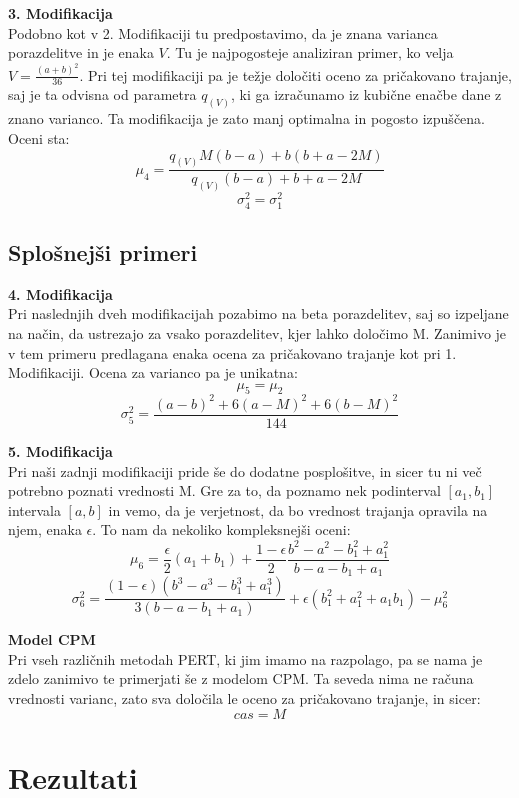 \documentclass[12pt, a4paper]{article}
\begin{document}
\vspace{0,5cm}
\textbf{3. Modifikacija}\\
Podobno kot v 2. Modifikaciji tu predpostavimo, da je znana varianca porazdelitve in je enaka $V$. Tu je najpogosteje analiziran primer, ko velja $V = \frac{(a + b)^2}{36}$. Pri tej modifikaciji pa je težje določiti oceno za pričakovano trajanje, saj je ta odvisna od parametra $q_{(V)}$, ki ga izračunamo iz kubične enačbe dane z znano varianco. Ta modifikacija je zato manj optimalna in pogosto izpuščena. Oceni sta:
$$\mu_4 = \frac{q_{(V)}M(b - a) + b(b + a -2M)}{q_{(V)}(b - a) + b + a - 2M}$$
$$\sigma_4^2 = \sigma_1^2$$


\subsection{Splošnejši primeri}
\textbf{4. Modifikacija}\\
Pri naslednjih dveh modifikacijah pozabimo na beta porazdelitev, saj so izpeljane na način, da ustrezajo za vsako porazdelitev, kjer lahko določimo M. Zanimivo je v tem primeru predlagana enaka ocena za pričakovano trajanje kot pri 1. Modifikaciji. Ocena za varianco pa je unikatna:
$$\mu_5 = \mu_2$$
$$\sigma_5^2 = \frac{(a - b)^2 + 6(a - M)^2 + 6(b - M)^2}{144}$$

\vspace{0,5cm}
\textbf{5. Modifikacija}\\
Pri naši zadnji modifikaciji pride še do dodatne posplošitve, in sicer tu ni več potrebno poznati vrednosti M. Gre za to, da poznamo nek podinterval $[a_1, b_1]$ intervala $[a, b]$ in vemo, da je verjetnost, da bo vrednost trajanja opravila na njem, enaka $\epsilon$. To nam da nekoliko kompleksnejši oceni:
$$\mu_6 = \frac{\epsilon}{2}(a_1 + b_1) + \frac{1 - \epsilon}{2}\frac{b^2 - a^2 - b_1^2 + a_1^2}{b - a - b_1 + a_1}$$
$$\sigma_6^2 = \frac{(1 - \epsilon)(b^3 - a^3 - b_1^3 + a_1^3)}{3(b - a - b_1 + a_1)} + \epsilon(b_1^2 + a_1^2 + a_1b_1) - \mu_6^2$$

\vspace{0,5cm}
\textbf{Model CPM}\\
Pri vseh različnih metodah PERT, ki jim imamo na razpolago, pa se nama je zdelo zanimivo te primerjati še z modelom CPM. Ta seveda nima ne računa vrednosti varianc, zato sva določila le oceno za pričakovano trajanje, in sicer:
$$cas = M$$


\newpage{}

\section{Rezultati}
\end{document}
